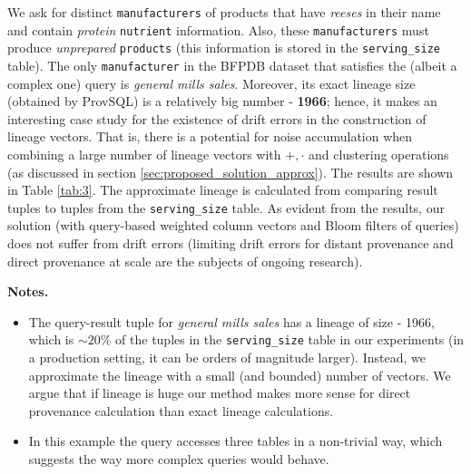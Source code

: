 \begin{example-withrun}\label{experiment:3}
% 
We ask for distinct \texttt{manufacturers} of products that have \textit{reeses} in their name and contain \textit{protein}
                         \texttt{nutrient} information.
                Also, these \texttt{manufacturers} must produce \textit{unprepared} \texttt{products} (this information is stored in the \texttt{serving\_size} table).
The only \texttt{manufacturer} in the BFPDB dataset that satisfies the (albeit a complex one) query is \textit{general mills sales}. Moreover, its exact lineage size (obtained by ProvSQL) is a relatively big number - \textbf{1966}; hence, it makes an interesting case study for the existence of drift errors in the construction of lineage vectors. That is, there is a potential for noise accumulation when combining a large number of lineage vectors with $+,\cdot$ and clustering operations (as discussed in section \ref{sec:proposed_solution_approx}). 
The results are shown in Table \ref{tab:3}. The approximate lineage is calculated from comparing result tuples to tuples from the \texttt{serving\_size} table. As evident from the results, our solution (with query-based weighted column vectors and Bloom filters of queries) does not suffer from drift errors (limiting drift errors for distant provenance and direct provenance at scale are the subjects of ongoing research).
\par\textbf{Notes.} 
\begin{itemize}
    \item The query-result tuple for \textit{general mills sales} has a lineage of size - 1966, which is ${\sim}20\%$ of the tuples in the \texttt{serving\_size} table in our experiments (in a production setting, it can be orders of magnitude larger). Instead, we approximate the lineage with a small (and bounded) number of vectors. We argue that if lineage is huge our method makes more sense for direct provenance calculation than exact lineage calculations.
    \item In this example the query accesses three tables in a non-trivial way, which suggests the way more complex queries would behave.
\end{itemize}



\end{example-withrun}